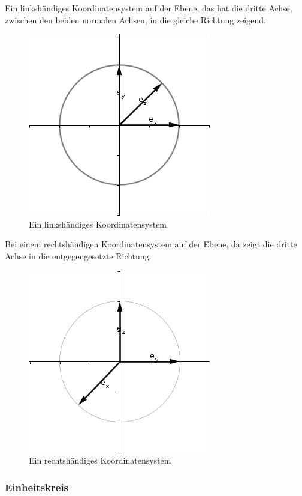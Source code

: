 \documentclass[a4paper]{article}
\begin{document}
Ein linksh\"andiges Koordinatensystem auf der Ebene, das hat die dritte Achse, zwischen den beiden normalen Achsen, in die gleiche Richtung zeigend.\\

\begin{figure}
\caption{Ein linksh\"andiges Koordinatensystem}
\includegraphics[scale=0.5]{lefthand45.png}
\end{figure}

Bei einem rechtsh\"andigen Koordinatensystem auf der Ebene, da zeigt die dritte Achse in die entgegengesetzte Richtung.\\

\begin{figure}
\caption{Ein rechtsh\"andiges Koordinatensystem}
\includegraphics[scale=0.5]{righthand45.png}
\end{figure}

\subsubsection{Einheitskreis}
\end{document}
